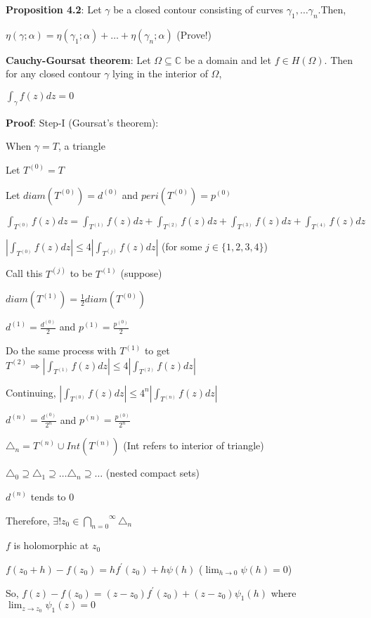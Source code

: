 \documentclass{article}
\begin{document}
\begin{flushleft}
\textbf{Proposition 4.2}: Let $\gamma$ be a closed contour consisting of curves $\gamma_1,\dots \gamma_n$.Then,

$\eta(\gamma;\alpha)=\eta(\gamma_1;\alpha)+\dots +\eta(\gamma_n;\alpha)$ (Prove!)

\textbf{Cauchy-Goursat theorem}: Let $\Omega\subseteq \mathds{C}$ be a domain and let $f\in H(\Omega)$. Then for any closed contour $\gamma$ lying in the interior of $\Omega$,

$\int_{\gamma}^{} f(z) dz=0$

\textbf{Proof}: Step-I (Goursat's theorem): 

When $\gamma=T$, a triangle

Let $T^{(0)}=T$

Let $diam(T^{(0)})=d^{(0)}$ and $peri(T^{(0)})=p^{(0)}$


$\int_{T^{(0)}}^{} f(z) dz =\int_{T^{(1)}}^{} f(z) dz + \int_{T^{(2)}}^{} f(z) dz + \int_{T^{(3)}}^{} f(z) dz + \int_{T^{(4)}}^{} f(z) dz$

$|\int_{T^{(0)}}^{} f(z) dz| \leq 4|\int_{T^{(j)}}^{} f(z) dz|$ (for some $j\in \{1,2,3,4\}$)

Call this $T^{(j)}$ to be $T^{(1)}$ (suppose)

$diam(T^{(1)})=\frac{1}{2}diam(T^{(0)})$ 

$d^{(1)}=\frac{d^{(0)}}{2}$ and $p^{(1)}=\frac{p^{(0)}}{2}$

Do the same process with $T^{(1)}$ to get $T^{(2)}\Rightarrow |\int_{T^{(1)}}^{} f(z) dz| \leq 4|\int_{T^{(2)}}^{} f(z) dz|$ 

Continuing, $|\int_{T^{(0)}}^{} f(z) dz| \leq 4^n|\int_{T^{(n)}}^{} f(z) dz|$ 

$d^{(n)}=\frac{d^{(0)}}{2^n}$ and $p^{(n)}=\frac{p^{(0)}}{2^n}$

$\triangle_n= T^{(n)} \cup Int(T^{(n)})$ (Int refers to interior of triangle)

$\triangle_0\supseteq \triangle_1 \supseteq \dots \triangle_n\supseteq \dots$ (nested compact sets)

$d^{(n)}$ tends to $0$

Therefore, $\exists!z_0 \in \overset{\infty}{\underset{n=0}{\bigcap}} \triangle_n$

$f$ is holomorphic at $z_0$

$f(z_0+h)-f(z_0)=hf^{'}(z_0)+h\psi(h)$ ($\lim_{h \to 0}\psi(h)=0$)

So, $f(z)-f(z_0)=(z-z_0)f^{'}(z_0) + (z-z_0)\psi_1(h)$ where $\lim_{z \to z_0}\psi_1(z)=0$


\end{flushleft}
\end{document}
